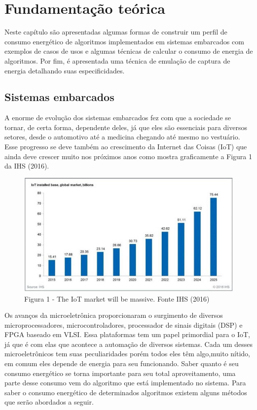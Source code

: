 \chapter{Fundamentação teórica}
\label{CAP2}


Neste capítulo são apresentadas algumas formas de construir um perfil de consumo energético de algoritmos implementados em sistemas embarcados com exemplos de casos de usos e algumas técnicas de calcular o consumo de energia de algoritmos. Por fim, é apresentada uma técnica de emulação de captura de energia detalhando suas especificidades.


\section{Sistemas embarcados}
A enorme de evolução dos sistemas embarcados fez com que a sociedade se tornar, de certa forma, dependente deles, já que eles são essenciais para diversos setores, desde o automotivo até a medicina chegando até mesmo no vestuário. Esse progresso  se deve também ao crescimento da Internet das Coisas (IoT) 	que ainda deve crescer muito nos próximos anos como mostra graficamente a Figura 1 da IHS (2016).  
\begin{figure}[!ht]
\centering
\includegraphics[scale=.65]{figures/grafico.jpg}
\caption{ Figura 1 - The IoT market will be massive. Fonte IHS (2016) } \label{Fig:1}
\end{figure}

Os avanços da microeletrônica proporcionaram o surgimento de diversos microprocessadores, microcontroladores, processador de sinais digitais (DSP) e FPGA baseado em VLSI. Essa plataformas tem um papel primordial para o  IoT, já que é com elas  que acontece a automação de diversos sistemas. Cada um desses  microeletrônicos tem suas peculiaridades porém todos eles têm algo,muito nítido, em comum eles depende de energia para seu funcionando. Saber quanto é seu consumo energético se torna importante para seu total aproveitamento, uma parte desse consumo vem do algoritmo que está implementado no sistema. Para saber o consumo energético de determinados algoritmos existem alguns métodos que serão abordados a seguir.


